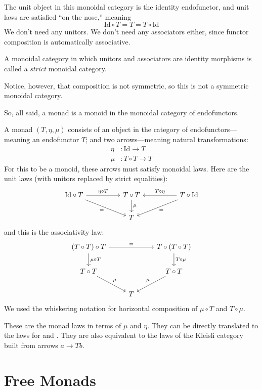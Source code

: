 \documentclass[DaoFP]{subfiles}
\begin{document}
The unit object in this monoidal category is the identity endofunctor, and unit laws are satisfied ``on the nose,'' meaning
\[ \text{Id} \circ T = T = T \circ \text{Id}\]
We don't need any unitors. We don't need any associators either, since functor composition is automatically associative. 

A monoidal category in which unitors and associators are identity morphisms is called a \emph{strict} monoidal category.

Notice, however, that composition is not symmetric, so this is not a symmetric monoidal category.

So, all said, a monad is a monoid in the monoidal category of endofunctors. 

A monad $(T, \eta, \mu)$ consists of an object in the category of endofunctors---meaning an endofunctor $T$; and two arrows---meaning natural transformations:
\begin{align*}
 \eta &\colon \text{Id} \to T \\
 \mu &\colon T \circ T \to T 
\end{align*}
For this to be a monoid, these arrows must satisfy monoidal laws. Here are the unit laws (with unitors replaced by strict equalities):
\[
 \begin{tikzcd}
\text{Id} \circ T
 \arrow[rr, "\eta \circ T"]
 \arrow[rrd, "="']
& & T \circ T
 \arrow[d, "\mu"]
&& T \circ \text{Id}
 \arrow[ll, "T \circ \eta"']
 \arrow[lld, "="]
 \\
 && T
  \end{tikzcd}
\]
and this is the associativity law:
\[
 \begin{tikzcd}
 (T \circ T) \circ T 
 \arrow[rr, "="]
 \arrow[d, "\mu \circ T"]
 &&
 T \circ (T \circ T)
 \arrow[d, "T \circ \mu"]
 \\
 T \circ T 
 \arrow[dr, "\mu"]
& & T \circ T
 \arrow[dl, "\mu"']
 \\
&  T
 \end{tikzcd}
\]
We used the whiskering notation for horizontal composition of $\mu \circ T$ and $T \circ \mu$.

These are the monad laws in terms of $\mu$ and $\eta$. They can be directly translated to the laws for  and . They are also equivalent to the laws of the Kleisli category built from arrows $a \to T b$.

\section{Free Monads}
\end{document}
